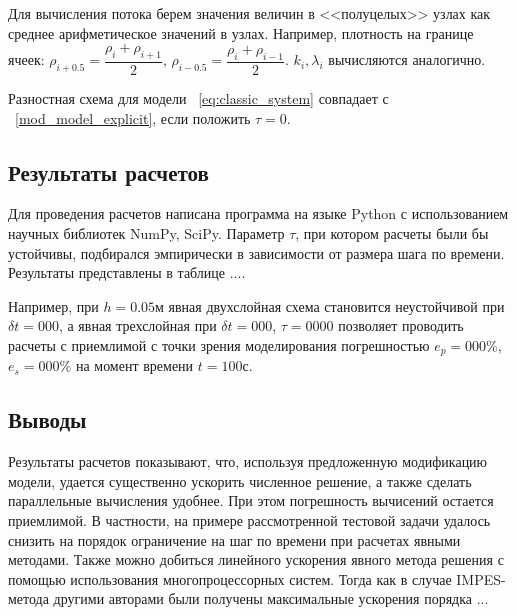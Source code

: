 Для вычисления потока берем значения величин в <<полуцелых>> узлах как среднее арифметическое
значений в узлах. Например, плотность на границе ячеек:
$\rho_{i+0.5}=\dfrac{\rho_i+\rho_{i+1}}{2},\, \rho_{i-0.5}=\dfrac{\rho_i+\rho_{i-1}}{2}$.
$k_i, \lambda_i$ вычисляются аналогично.

Разностная схема для модели ~\ref{eq:classic_system} совпадает с ~\ref{mod_model_explicit}, если положить $\tau=0$.

\subsection{Результаты расчетов}
\label{calc_results}
Для проведения расчетов написана программа на языке Python с использованием научных библиотек NumPy, SciPy.
Параметр $\tau$, при котором расчеты были бы устойчивы, подбирался эмпирически в зависимости от размера шага по времени.
Результаты представлены в таблице ....

Например, при $h=0.05$м явная двухслойная схема становится неустойчивой при $\delta t=000$, а явная
трехслойная при $\delta t=000$, $\tau=0000$ позволяет проводить расчеты с приемлимой с точки зрения моделирования
погрешностью $e_p=000\%$, $e_s=000\%$ на момент времени $t=100$с.

\subsection{Выводы}
\label{calc_conclusions}
Результаты расчетов показывают, что, используя предложенную модификацию модели, удается существенно ускорить
численное решение, а также сделать параллельные вычисления удобнее. При этом погрешность вычисений остается
приемлимой. В частности, на примере рассмотренной тестовой задачи удалось снизить на порядок ограничение на шаг по времени
при расчетах явными методами.
Также можно добиться линейного ускорения явного метода решения с помощью использования многопроцессорных систем. 
Тогда как в случае IMPES-метода другими авторами были получены максимальные ускорения порядка ...